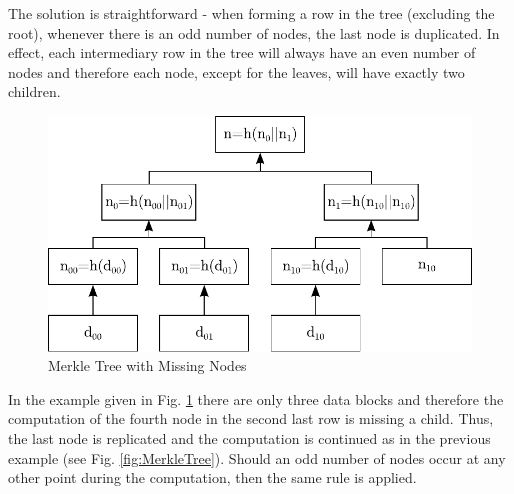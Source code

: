 \noindent
The solution is straightforward - when forming a row in the tree (excluding the root), whenever there is an odd number of nodes, the last node is duplicated. In effect, each intermediary row in the tree will always have an even number of nodes and therefore each node, except for the leaves, will have exactly two children.

\clearpage

\begin{figure}[htbp]
 \centering
 \includegraphics[scale=0.85]{Images/MerkleTree2.pdf}
 \caption{Merkle Tree with Missing Nodes}
 \label{fig:MerkleTree2}
\end{figure}
\vspace{-10pt}

\noindent
In the example given in Fig. \ref{fig:MerkleTree2} there are only three data blocks and therefore the computation of the fourth node in the second last row is missing a child. Thus, the last node is replicated and the computation is continued as in the previous example (see Fig. \ref{fig:MerkleTree}). Should an odd number of nodes occur at any other point during the computation, then the same rule is applied.